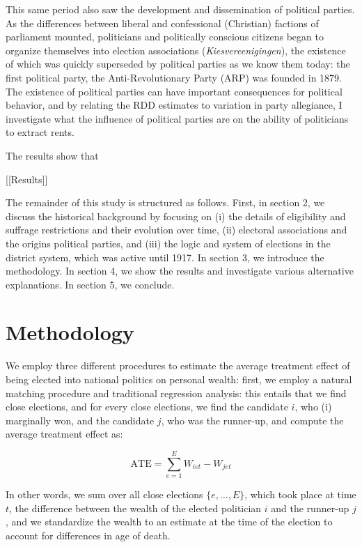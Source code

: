 \documentclass[]{book}
\begin{document}
This same period also saw the development and dissemination of political parties. As the differences between liberal and confessional (Christian) factions of parliament mounted, politicians and politically conscious citizens began to organize themselves into election associations (\textit{Kiesvereenigingen}), the existence of which was quickly superseded by political parties as we know them today: the first political party, the Anti-Revolutionary Party (ARP) was founded in 1879. The existence of political parties can have important consequences for political behavior, and by relating the RDD estimates to variation in party allegiance, I investigate what the influence of political parties are on the ability of politicians to extract rents.

The results show that

{[}{[}Results{]}{]}

The remainder of this study is structured as follows. First, in section 2, we discuss the historical background by focusing on (i) the details of eligibility and suffrage restrictions and their evolution over time, (ii) electoral associations and the origins political parties, and (iii) the logic and system of elections in the district system, which was active until 1917. In section 3, we introduce the methodology. In section 4, we show the results and investigate various alternative explanations. In section 5, we conclude.

\hypertarget{methodology}{%
\section{Methodology}\label{methodology}}

We employ three different procedures to estimate the average treatment effect of being elected into national politics on personal wealth: first, we employ a natural matching procedure and traditional regression analysis: this entails that we find close elections, and for every close elections, we find the candidate \(i\), who (i) marginally won, and the candidate \(j\), who was the runner-up, and compute the average treatment effect as:

\[ \text{ATE} = \displaystyle\sum_{e = 1}^{E} W_{iet} - W_{jet} \]

In other words, we sum over all close elections \(\{e, \dots, E\}\), which took place at time \(t\), the difference between the wealth of the elected politician \(i\) and the runner-up \(j\), and we standardize the wealth to an estimate at the time of the election to account for differences in age of death.
\end{document}
